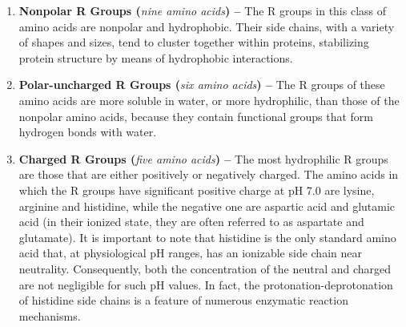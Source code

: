 \begin{enumerate}
\item \textbf{Nonpolar R Groups (}\textit{nine amino acids}\textbf{) --} %
The R groups in this class of amino acids are nonpolar and hydrophobic. Their side chains, with a variety of shapes and sizes, tend to cluster together within proteins, stabilizing protein structure by means of hydrophobic interactions.

\item \textbf{Polar-uncharged R Groups (}\textit{six amino acids}\textbf{) --} %
The R groups of these amino acids are more soluble in water, or more hydrophilic, than those of the nonpolar amino acids, because they contain functional groups that form hydrogen bonds with water.%

\item \textbf{Charged R Groups (}\textit{five amino acids}\textbf{) --} %
The most hydrophilic R groups are those that are either positively or negatively charged. 
The amino acids in which the R groups have significant positive charge at pH 7.0 are lysine, arginine and histidine, while the negative one are aspartic acid and glutamic acid (in their ionized state, they are often referred to as aspartate and glutamate). It is important to note that histidine is the only standard amino acid that, at physiological pH ranges, has an ionizable side chain near neutrality. Consequently, both the concentration of the neutral and charged are not negligible for such pH values. In fact, the protonation-deprotonation of histidine side chains is a feature of numerous enzymatic reaction mechanisms.
\end{enumerate}

